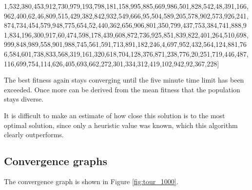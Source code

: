 \documentclass[a4paper,10pt]{article}
\begin{document}
1,532,380,453,912,730,979,193,798,181,158,995,885,669,986,501,828,542,48,391,166,962,400,62,46,809,515,429,382,842,932,549,666,95,504,589,205,578,902,573,926,241,874,734,454,579,948,775,654,52,440,362,656,906,801,350,799,437,753,384,741,888,91,834,196,300,917,60,474,598,178,439,608,872,736,925,851,839,822,401,264,510,698,999,848,989,558,901,988,745,561,591,713,891,182,246,4,697,952,432,564,124,881,766,584,601,738,833,568,319,161,320,618,704,128,376,871,238,776,20,251,719,446,487,116,699,754,114,626,405,693,662,272,301,334,312,419,102,942,92,367,228]

The best fitness again stays converging until the five minute time limit has been exceeded. Once more can be derived from the mean fitness that the population stays diverse.

It is difficult to make an estimate of how close this solution is to the most optimal solution, since only a heuristic value was known, which this algorithm clearly outperforms.

\subsection{Convergence graphs}
The convergence graph is shown in Figure \ref{fig:tour_1000}.
\end{document}
